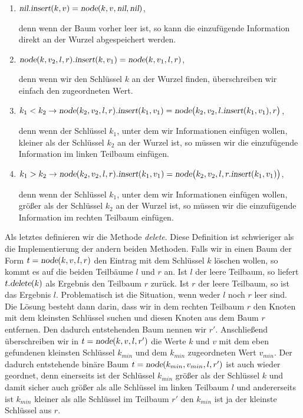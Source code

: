 \begin{enumerate}
\item $\textsl{nil}\mathtt{.}\textsl{insert}(k,v) = \textsl{node}(k,v, \textsl{nil}, \textsl{nil})$,
  
      denn wenn der Baum vorher leer ist, so kann die einzuf\"ugende Information direkt an
      der Wurzel abgespeichert werden.
\item $\textsl{node}(k, v_2, l, r)\mathtt{.}\textsl{insert}(k,v_1) = \textsl{node}(k, v_1, l, r)$,

      denn wenn wir den Schl\"ussel $k$ an der Wurzel finden, \"uberschreiben wir einfach den zugeordneten 
      Wert.
\item $k_1 < k_2 \rightarrow 
          \textsl{node}(k_2, v_2, l, r)\mathtt{.}\textsl{insert}(k_1, v_1) =
          \textsl{node}\bigl(k_2, v_2, l\mathtt{.}\textsl{insert}(k_1, v_1), r\bigr)$,

      denn wenn der Schl\"ussel $k_1$, unter dem wir Informationen einf\"ugen wollen, kleiner
      als der Schl\"ussel $k_2$ an der Wurzel ist, so m\"ussen wir die einzuf\"ugende
      Information im linken Teilbaum einf\"ugen.
\item $k_1 > k_2 \rightarrow 
         \textsl{node}(k_2, v_2, l, r)\mathtt{.}\textsl{insert}(k_1, v_1) = 
         \textsl{node}\bigl(k_2, v_2, l, r\mathtt{.}\textsl{insert}(k_1, v_1)\bigr)$,

      denn wenn der Schl\"ussel $k_1$, unter dem wir Informationen einf\"ugen wollen, gr\"o{\ss}er
      als der Schl\"ussel $k_2$ an der Wurzel ist, so m\"ussen wir die einzuf\"ugende
      Information im rechten Teilbaum einf\"ugen.
\end{enumerate}
Als letztes definieren wir die Methode \textsl{delete}. Diese Definition ist schwieriger als
die Implementierung der andern beiden Methoden.  Falls wir in einen Baum der Form
$t =\textsl{node}(k,v,l,r)$ den Eintrag mit dem Schl\"ussel $k$ l\"oschen wollen, so
kommt es auf die beiden Teilb\"aume $l$ und $r$ an.  Ist $l$ der leere Teilbaum,
so liefert $t\mathtt{.}\textsl{delete}(k)$ als Ergebnis den Teilbaum $r$ zur\"uck.
Ist $r$ der leere Teilbaum, so ist das Ergebnis $l$.  Problematisch ist die Situation,
wenn weder $l$ noch $r$ leer sind.  
Die L\"osung besteht dann darin, dass wir in dem rechten
Teilbaum $r$ den Knoten mit dem kleinsten Schl\"ussel suchen und diesen Knoten aus dem
Baum $r$ entfernen.  Den dadurch entstehenden Baum nennen wir $r'$.
 Anschlie{\ss}end \"uberschreiben wir in $t =\textsl{node}(k,v,l,r')$ die
Werte $k$ und $v$ mit dem eben gefundenen kleinsten Schl\"ussel $k_{min}$ und dem $k_{min}$
zugeordneten Wert $v_{min}$.  Der dadurch entstehende bin\"are Baum 
$t=\textsl{node}(k_{min},v_{min},l,r')$
 ist auch wieder
geordnet, denn einerseits ist der Schl\"ussel $k_{min}$  gr\"o{\ss}er als der Schl\"ussel $k$ und
damit sicher auch gr\"o{\ss}er als alle Schl\"ussel im linken Teilbaum $l$ und andererseits ist
$k_{min}$ kleiner als alle  Schl\"ussel im Teilbaum $r'$ den $k_{min}$ ist ja der
kleinste Schl\"ussel aus $r$.  


